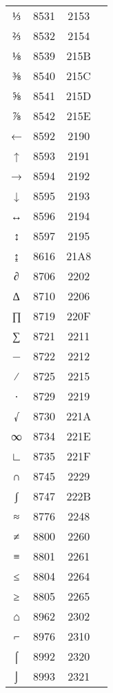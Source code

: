 \documentclass[10pt]{article}
\begin{document}
\begin{tabular}{crcl}
⅓&8531&2153&\\
⅔&8532&2154&\\
⅛&8539&215B&\\
⅜&8540&215C&\\
⅝&8541&215D&\\
⅞&8542&215E&\\
←&8592&2190&\\
↑&8593&2191&\\
→&8594&2192&\\
↓&8595&2193&\\
↔&8596&2194&\\
↕&8597&2195&\\
↨&8616&21A8&\\
∂&8706&2202&\\
∆&8710&2206&\\
∏&8719&220F&\\
∑&8721&2211&\\
−&8722&2212&\\
∕&8725&2215&\\
∙&8729&2219&\\
√&8730&221A&\\
∞&8734&221E&\\
∟&8735&221F&\\
∩&8745&2229&\\
∫&8747&222B&\\
≈&8776&2248&\\
≠&8800&2260&\\
≡&8801&2261&\\
≤&8804&2264&\\
≥&8805&2265&\\
⌂&8962&2302&\\
⌐&8976&2310&\\
⌠&8992&2320&\\
⌡&8993&2321&\\
\end{tabular}
\end{document}
